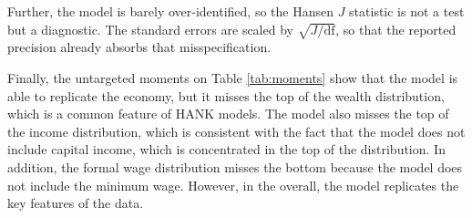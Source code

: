 \documentclass[12pt]{article}
\begin{document}
Further, the model is barely over-identified, so the Hansen $J$ statistic is not a test
but a diagnostic. The standard errors are scaled by $\sqrt{J/\mathrm{df}}$, so that the
reported precision already absorbs that misspecification.



Finally, the untargeted moments on Table \ref{tab:moments} show that the model is able
to replicate the economy, but it misses the top of the wealth distribution, which is a
common feature of HANK models. The model also misses the top of the income distribution,
which is consistent with the fact that the model does not include capital income, which
is concentrated in the top of the distribution. In addition, the formal wage
distribution misses the bottom because the model does not include the minimum wage.
However, in the overall, the model replicates the key features of the data.


\end{document}
